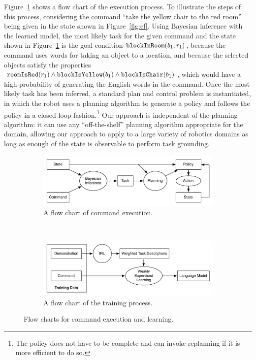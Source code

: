 \documentclass[conference]{IEEEtran}
\begin{document}
Figure~\ref{fig:execute} shows a flow chart of the execution process. To illustrate the steps of this process, considering the command ``take the yellow chair to the red room'' being given in the state shown in Figure~\ref{fig:ef}. Using Bayesian inference with the learned model, the most likely task for the given command and the state shown in Figure~\ref{fig:execute} is the goal condition ${\tt blockInRoom}(b_1, r_1)$, because the command uses words for taking an object to a location, and because the selected objects satisfy the properties ${\tt roomIsRed}(r_1) \land {\tt blockIsYellow}(b_1) \land {\tt blockIsChair}(b_1)$, which would have a high probability of generating the English words in the command. Once the most likely task has been inferred, a standard plan and control problem is instantiated, in which the robot uses a planning algorithm to generate a policy and follows the policy in a closed loop fashion.\footnote{The policy does not have to be complete and can invoke replanning if it is more efficient to do so.} Our approach is independent of the planning algorithm: it can use any ``off-the-shelf'' planning algorithm appropriate for the domain, allowing our approach to apply to a large variety of robotics domains as long as enough of the state is observable to perform task grounding.

\begin{figure}
        \centering
        \begin{subfigure}[b]{\columnwidth}
                \includegraphics[width=\textwidth]{images/executeFlow}
                \caption{\small A flow chart of command execution.}
                \label{fig:execute}
        \end{subfigure}%
        \\
        \begin{subfigure}[b]{\columnwidth}
                \includegraphics[width=\textwidth]{images/trainFlow}
                \caption{\small A flow chart of the training process.}
                \label{fig:learn}
        \end{subfigure}
        \caption{\small Flow charts for command execution and learning.}\label{fig:flow}
\end{figure}
\end{document}
